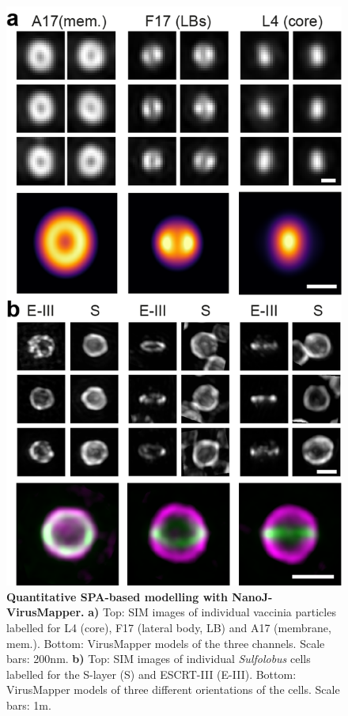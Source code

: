   \begin{figure}[!t]
    \centering
    \includegraphics{Figures/NanoJ_VirusMapperFigure_v3.png}
    \caption{\textbf{Quantitative SPA-based modelling with NanoJ-VirusMapper.} \textbf{a)} Top: SIM images of individual vaccinia particles labelled for L4 (core), F17 (lateral body, LB) and A17 (membrane, mem.). Bottom: VirusMapper models of the three channels. Scale bars: 200nm. \textbf{b)} Top: SIM images of individual \emph{Sulfolobus} cells labelled for the S-layer (S) and ESCRT-III (E-III). Bottom: VirusMapper models of three different orientations of the cells. Scale bars: 1\micro m. }
    \label{fig:VirusMapper}
 \end{figure}


